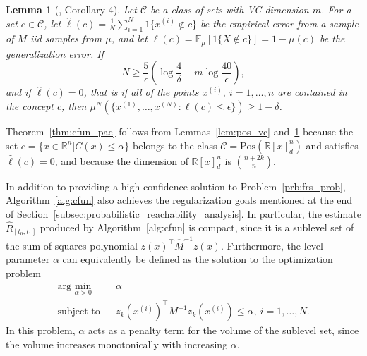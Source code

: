 \documentclass[letterpaper, 10 pt, conference]{ieeeconf}
\newcommand{\R}{\mathbb{R}}
\newcommand{\Ex}{\mathbb{E}}
\newcommand{\ind}{1}
\newcommand{\ars}{\ensuremath{\hat{R}_{[t_0,t_1]}}}
\newtheorem{lemma}{Lemma}
\begin{document}
\begin{lemma}[\cite{alamo2009randomized}, Corollary 4]
    \label{lem:generic_pac}
    Let $\mathcal{C}$ be a class of sets with VC dimension $m$. For a set
    $c\in\mathcal{C}$, let $\hat{\ell}(c)=\frac{1}{N}\sum_{i=1}^N
    \ind\{x^{(i)}\notin c\} $ be the empirical error from a sample of $M$ iid
    samples from $\mu$, and let $\ell(c)=\Ex_\mu[\ind\{X\notin c\}]=1-\mu(c)$ be the
    generalization error. If
    \begin{equation}
        \label{eq:generic_pac_bound}
        N \ge \frac{5}{\epsilon}\left(
            \log\frac{4}{\delta} + m \log\frac{40}{\epsilon}
        \right),
    \end{equation}
    and if $\hat{\ell}(c)=0$, that is if all of the points $x^{(i)},\ i=1,\dotsc,n$ are contained in the concept $c$, then $\mu^N\left(\{x^{(1)},\dotsc,x^{(N)} : \ell(c) \le \epsilon\}\right) \ge 1-\delta$.
\end{lemma}
Theorem~\ref{thm:cfun_pac} follows from Lemmas~\ref{lem:pos_vc} and~\ref{lem:generic_pac}
%
because the
set $c=\{x\in\R^n | C(x) \le \alpha\}$
belongs to the class $\mathcal{C}=\text{Pos}(\R[x]^n_d)$ and satisfies
$\hat{\ell}(c)=0$, and because the dimension of $\R[x]^n_d$ is $\binom{n+2k}{n}$.

In addition to providing a high-confidence solution to
Problem~\ref{prb:frs_prob}, Algorithm~\ref{alg:cfun} also achieves the
regularization goals mentioned at the end of Section~\ref{subsec:probabilistic_reachability_analysis}. In particular,
the estimate $\ars$ produced by Algorithm~\ref{alg:cfun} is compact, since it is
a sublevel set of the sum-of-squares polynomial $z(x)^\top \hat{M}^{-1} z(x)$.
Furthermore, the
level parameter $\alpha$ can equivalently be defined as the solution to the
optimization problem
\begin{equation*}
    \begin{aligned}
&\text{arg }\underset{\alpha > 0}{\text{min}}
& & \alpha & \\
& \text{subject to}
& & z_k(x^{(i)})^\top M^{-1} z_k(x^{(i)}) \le \alpha,\ i=1,\dotsc,N.
    \end{aligned}
\end{equation*}
In this problem, $\alpha$ acts as a penalty term for the volume of the sublevel
set, since the volume increases monotonically with increasing $\alpha$.
%
\end{document}
